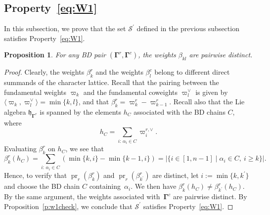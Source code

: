 \documentclass[11pt]{article}
\newcommand{\bg}{\mathbf{\Gamma}}
\DeclareMathOperator{\pr}{pr}
\newtheorem{proposition}[theorem]{Proposition}%
\theoremstyle{definition}\newtheorem{definition}[theorem]{Definition}
\theoremstyle{definition}\newtheorem{remark}[theorem]{Remark}
\theoremstyle{remark}
\numberwithin{equation}{section}
\begin{document}
\subsection{\texorpdfstring{Property~\eqref{eq:W1}}{Property W1}}
In this subsection, we prove that the set $\mathcal{S}^\prime$ defined in the previous subsection satisfies Property~\eqref{eq:W1}.

\begin{proposition}\label{p:difw}
    For any BD pair $(\bg^r,\bg^c)$, the weights $\beta_{kl}$ are pairwise distinct.
\end{proposition}
\begin{proof}
    Clearly, the weights $\beta_{k}^r$ and the weights $\beta_{l}^c$ belong to different direct summands of the character lattice. Recall that the pairing between the fundamental weights $\varpi_k$ and the fundamental coweights $\varpi_l^{\vee}$ is given by $\langle \varpi_k,\varpi_l^{\vee}\rangle = \min \{k,l\}$, and that $\beta_{k}^r = \varpi_k^r - \varpi_{k-1}^r$. Recall also that the Lie algebra $\mathfrak{h}_{\bg^r}$ is spanned by the elements $h_C$ associated with the BD chains $C$, where
    \begin{equation*}
        h_C = \sum_{i:\, \alpha_i \in C}\varpi_i^{r,\vee}.
    \end{equation*}
    Evaluating $\beta_k^r$ on $h_C$, we see that
    \begin{equation*}
        \beta_{k}^r(h_C) = \sum_{i:\, \alpha_i \in C} (\min\{k,i\}-\min\{k-1,i\}) = |\{i \in [1,n-1] \mid \alpha_i \in C, \ i \geq k\}|.
    \end{equation*}
    Hence, to verify that $\pr_r(\beta_{k}^r)$ and $\pr_r(\beta_{k^\prime}^r)$ are distinct, let $i := \min\{k,k^\prime\}$ and choose the BD chain $C$ containing~$\alpha_i$. We then have $\beta_{k}^r(h_C) \neq \beta_{k^\prime}^r(h_C)$. By the same argument, the weights associated with~$\bg^c$ are pairwise distinct. By Proposition~\ref{p:w1check}, we conclude that $\mathcal{S}^\prime$ satisfies Property~\eqref{eq:W1}.
\end{proof}
\end{document}
